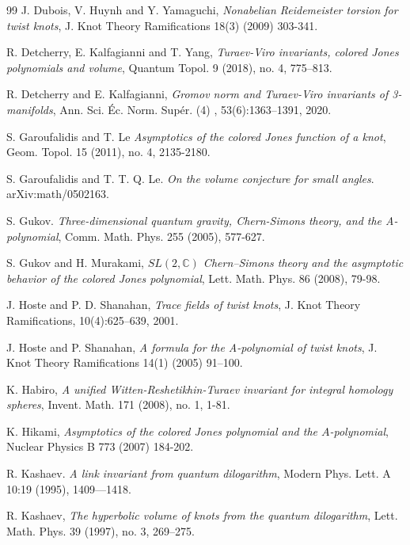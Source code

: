 \documentclass[12pt]{amsart}
\begin{document}
\begin{thebibliography}{99}
J. Dubois, V. Huynh and Y. Yamaguchi, {\em Nonabelian Reidemeister torsion for twist
knots}, J. Knot Theory Ramifications 18(3) (2009) 303-341.

 R. Detcherry, E. Kalfagianni and T. Yang, \emph{Turaev-Viro invariants, colored Jones polynomials and
volume}, Quantum Topol. 9 (2018), no. 4, 775–813.

 R. Detcherry and E. Kalfagianni, \emph{Gromov norm and Turaev-Viro invariants of 3-manifolds},   Ann. Sci.
\'Ec. Norm. Sup\'er. (4) , 53(6):1363–1391, 2020.


 S. Garoufalidis and T. Le \emph{Asymptotics of the colored Jones function of a knot},  Geom. Topol. 15 (2011), no. 4, 2135-2180.

 S. Garoufalidis and T. T. Q. Le. {\em On the volume conjecture for small angles}. arXiv:math/0502163.

 S. Gukov. {\em Three-dimensional quantum gravity, Chern-Simons theory, and the A-polynomial}, Comm.
Math. Phys. 255 (2005), 577-627.

 S. Gukov and H. Murakami, {\em $SL(2,\mathbb{C})$ Chern–Simons theory and the asymptotic behavior of the
colored Jones polynomial}, Lett. Math. Phys. 86 (2008), 79-98.

 J. Hoste and P. D. Shanahan, {\em Trace fields of twist knots}, J. Knot Theory Ramifications, 10(4):625–639, 2001.

 J. Hoste and P. Shanahan, {\em A formula for the A-polynomial of twist knots}, J. Knot
Theory Ramifications 14(1) (2005) 91–100.

 K. Habiro, \emph{A unified Witten-Reshetikhin-Turaev invariant
for integral homology spheres}, Invent. Math. 171 (2008), no. 1,
1-81.

 K. Hikami, {\em Asymptotics of the colored Jones polynomial and the $A$-polynomial}, Nuclear Physics B 773 (2007) 184-202.


  R.  Kashaev. {\em A link invariant from quantum
dilogarithm}, Modern Phys. Lett. A 10:19 (1995), 1409—1418.

 R. Kashaev, {\em The hyperbolic volume of knots from the quantum dilogarithm}, Lett. Math. Phys. 39
(1997), no. 3, 269–275.


\end{thebibliography}
\end{document}
